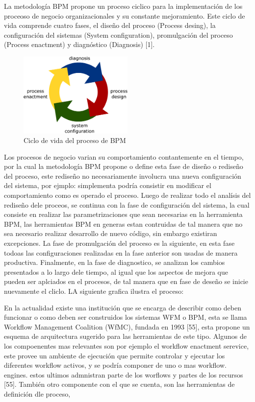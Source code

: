 La metodología BPM propone un proceso ciclico para la implementación de los proceoso de negocio organizacionales y su constante mejoramiento. Este ciclo de vida comprende cuatro fases, el diseño del proceso (Process desing), la configuración del sistemas (System configuration), promulgación del proceso (Process enactment) y diagnóstico (Diagnosis) [1]. 


\begin{figure}[htbp!] 
\centering    
\includegraphics[width=0.5\textwidth]{Chapter1/Figs/Figure_lifecycle}
\caption[CicloVida]{Ciclo de vida del proceso de BPM}
\label{fig:CicloVida}
\end{figure}



Los procesos de negocio varian su comportamiento contantemente en el tiempo, por la cual la metodología BPM propone o define esta fase de diseño o rediseño del proceso, este rediseño no necesariamente involucra una nueva configuración del sistema, por ejmplo: simplementa podría consistir en modificar el comportamiento como es operado el proceso. Luego de realizar todo el analísis del rediseño dele proceos, se continua con la fase de configuración del sistema, la cual consiste en realizar las parametrizaciones que sean necesarias en la herramienta BPM, las herramientas BPM en generas estan contruidas de tal manera que no sea necesario realizar desarrollo de nuevo código, sin embargo existiran excepciones. La fase de promulgación del proceso es la siguiente, en esta fase todoas las configuraciones realizadas en la fase anterior son usadas de manera productiva. Finalmente, en la fase de diagnostico, se analizan los cambios presentados a lo largo dele tiempo, al igual que los aspectos de mejora que pueden ser aplciados en el procesos, de tal manera que en fase de deseño se inicie nuevamente el cliclo. LA siguiente grafica ilustra el proceso:


En la actualidad existe una institución que se encarga de describir como deben funcionar o como deben ser construidos los sistemas WFM o BPM, esta se llama Workflow Management Coalition (WfMC), fundada en 1993 [55], esta propone un esquema de arquitectura sugerido para las herramientas de este tipo. Algunos de los compoenentes mas relevantes son por ejemplo el workflow enactment serevice, este provee un ambiente de ejecución que permite controlar y ejecutar los diferentes workflow activos, y se podría componer de uno o mas workflow. engines. estos ultimos admnistran parte de los worflows y partes de los recursos [55]. También otro componente con el que se cuenta, son las herramientas de definición dle proceso, 


